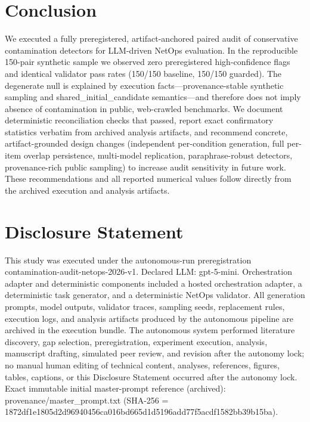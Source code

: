 \documentclass[conference]{IEEEtran}
\begin{document}
\section{Conclusion}
We executed a fully preregistered, artifact-anchored paired audit of conservative contamination detectors for LLM-driven NetOps evaluation. In the reproducible 150-pair synthetic sample we observed zero preregistered high-confidence flags and identical validator pass rates (150/150 baseline, 150/150 guarded). The degenerate null is explained by execution facts---provenance-stable synthetic sampling and shared\_initial\_candidate semantics---and therefore does not imply absence of contamination in public, web-crawled benchmarks. We document deterministic reconciliation checks that passed, report exact confirmatory statistics verbatim from archived analysis artifacts, and recommend concrete, artifact-grounded design changes (independent per-condition generation, full per-item overlap persistence, multi-model replication, paraphrase-robust detectors, provenance-rich public sampling) to increase audit sensitivity in future work. These recommendations and all reported numerical values follow directly from the archived execution and analysis artifacts.

\section*{Disclosure Statement}
This study was executed under the autonomous-run preregistration contamination-audit-netops-2026-v1. Declared LLM: gpt-5-mini. Orchestration adapter and deterministic components included a hosted orchestration adapter, a deterministic task generator, and a deterministic NetOps validator. All generation prompts, model outputs, validator traces, sampling seeds, replacement rules, execution logs, and analysis artifacts produced by the autonomous pipeline are archived in the execution bundle. The autonomous system performed literature discovery, gap selection, preregistration, experiment execution, analysis, manuscript drafting, simulated peer review, and revision after the autonomy lock; no manual human editing of technical content, analyses, references, figures, tables, captions, or this Disclosure Statement occurred after the autonomy lock. Exact immutable initial master-prompt reference (archived): provenance/master\_prompt.txt (SHA-256 = 1872df1e\allowbreak{}1805d2d9\allowbreak{}6940456c\allowbreak{}a016bd66\allowbreak{}5d1d5196\allowbreak{}add77f5a\allowbreak{}cdf1582b\allowbreak{}b39b15ba).
\end{document}
